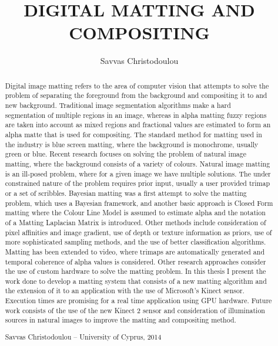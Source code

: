\documentclass[a4paper,11pt]{report}
\begin{document}
\msthesis

\title{DIGITAL MATTING AND COMPOSITING}
\author{Savvas Christodoulou}

\begin{abstract}
Digital image matting refers to the area of computer vision that attempts to solve the problem of separating the foreground from the background and compositing it to and new background. Traditional image segmentation algorithms make a hard segmentation of multiple regions in an image, whereas in alpha matting fuzzy regions are taken into account as mixed regions and fractional values are estimated to form an alpha matte that is used for compositing. The standard method for matting used in the industry is blue screen matting, where the background is monochrome, usually green or blue. Recent research focuses on solving the problem of natural image matting, where the background consists of a variety of colours. Natural image matting is an ill-posed problem, where for a given image we have multiple solutions. The under constrained nature of the problem requires prior input, usually a user provided trimap or a set of scribbles. 
Bayesian matting was a first attempt to solve the matting problem, which uses a Bayesian framework, and another basic approach is Closed Form matting where the Colour Line Model is assumed to estimate alpha and the notation of a Matting Laplacian Matrix is introduced. Other methods include consideration of pixel affinities and image gradient, use of depth or texture information as priors, use of more sophisticated sampling methods, and the use of better classification algorithms. Matting has been extended to video, where trimaps are automatically generated and temporal coherence of alpha values is considered. Other research approaches consider the use of custom hardware to solve the matting problem. 
In this thesis I present the work done to develop a matting system that consists of a new matting algorithm and the extension of it to an application with the use of Microsoft’s Kinect sensor. Execution times are promising for a real time application using GPU hardware. Future work consists of the use of the new Kinect 2 sensor and consideration of illumination sources in natural images to improve the matting and compositing method. 
\newline
\centerline{Savvas Christodoulou -- University of Cyprus, 2014}

\end{abstract}
\end{document}
